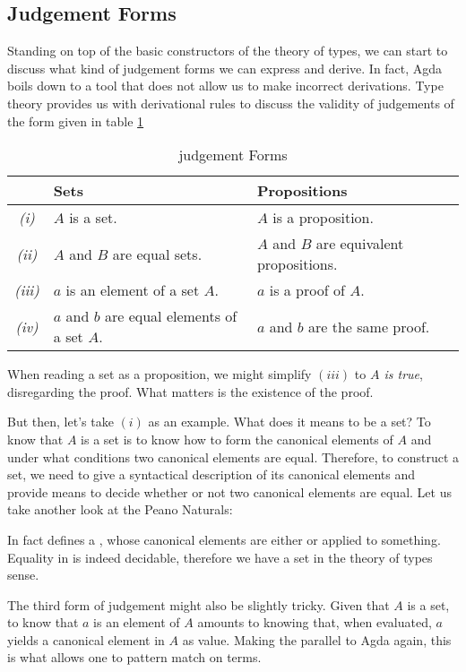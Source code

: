 \subsection{Judgement Forms}
Standing on top of the basic constructors of the theory of types, we can start to discuss
what kind of judgement forms we can express and derive. In fact, Agda boils down to a tool
that does not allow us to make incorrect derivations. Type theory provides us with derivational 
rules to discuss the validity of judgements of the form given in table \ref{table:judgement_forms}

\begin{center}
\begin{table}[h]
\begin{tabular}{c l l}
       & Sets & Propositions \\ \hline
  \textit{(i)}   & $A$ is a set. & $A$ is a proposition. \\
  \textit{(ii)}  & $A$ and $B$ are equal sets. & $A$ and $B$ are equivalent propositions. \\
  \textit{(iii)} & $a$ is an element of a set $A$. & $a$ is a proof of $A$. \\
  \textit{(iv)}  & $a$ and $b$ are equal elements of a set $A$. & $a$ and $b$ are the same proof. \\  
\end{tabular}
\caption{judgement Forms}
\label{table:judgement_forms}
\end{table}
\end{center}

When reading a set as a proposition, we might simplify $(iii)$ to \emph{$A$ is true}, disregarding
the proof. What matters is the existence of the proof.

But then, let's take $(i)$ as an example. What does it means to be a set? To know that $A$ is a set is
to know how to form the canonical elements of $A$ and under what conditions two canonical
elements are equal. Therefore, to construct a set, we need to give a syntactical description
of its canonical elements and provide means to decide whether or not two canonical elements
are equal. Let us take another look at the Peano Naturals:


In fact defines a , whose canonical elements are either  or
 applied to something. Equality in  is indeed decidable, therefore we have a set
in the theory of types sense.

The third form of judgement might also be slightly tricky. Given that $A$ is a set, 
to know that $a$ is an element of $A$ amounts to knowing that, when evaluated, $a$ yields a canonical element in $A$
as value. Making the parallel to Agda again, this is what allows one to pattern match on terms.

